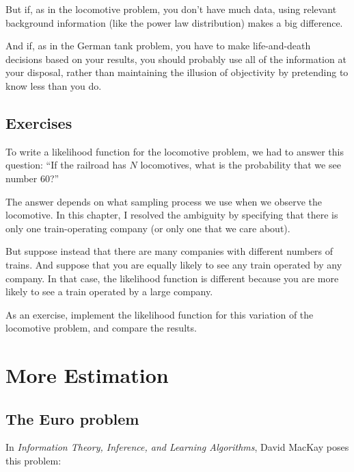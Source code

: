 \documentclass[12pt]{book}
\begin{document}
But if, as in the locomotive problem, you don't have much data,
using relevant background information (like the power law distribution)
makes a big difference.

And if, as in the German tank problem, you have to make life-and-death
decisions based on your results, you should probably use all of the
information at your disposal, rather than maintaining the illusion of
objectivity by pretending to know less than you do.


\section{Exercises}

\begin{exercise}
To write a likelihood function for the locomotive problem, we had
to answer this question:  ``If the railroad has $N$ locomotives, what
is the probability that we see number 60?''

The answer depends on what sampling process we use when we observe the
locomotive.  In this chapter, I resolved the ambiguity by specifying
that there is only one train-operating company (or only one that we
care about).

But suppose instead that there are many companies with different
numbers of trains.  And suppose that you are equally likely to see any
train operated by any company.
In that case, the likelihood function is different because you
are more likely to see a train operated by a large company.

As an exercise, implement the likelihood function for this variation
of the locomotive problem, and compare the results.

\end{exercise}




\chapter{More Estimation}
\label{more}

\section{The Euro problem}
\label{euro}

In {\it Information Theory, Inference, and Learning Algorithms}, David MacKay
poses this problem:
\end{document}
